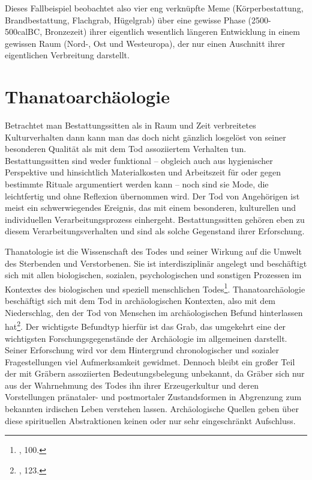 \documentclass[openany,twoside,twocolumn]{book}
\let\rmarkdownfootnote\footnote%
\def\footnote{\protect\rmarkdownfootnote}
\begin{document}
Dieses Fallbeispiel beobachtet also vier eng verknüpfte Meme
(Körperbestattung, Brandbestattung, Flachgrab, Hügelgrab) über eine
gewisse Phase (2500-500calBC, Bronzezeit) ihrer eigentlich wesentlich
längeren Entwicklung in einem gewissen Raum (Nord-, Ost und Westeuropa),
der nur einen Auschnitt ihrer eigentlichen Verbreitung darstellt.

\hypertarget{thanatoarchaologie}{%
\section{Thanatoarchäologie}\label{thanatoarchaologie}}

Betrachtet man Bestattungssitten als in Raum und Zeit verbreitetes
Kulturverhalten dann kann man das doch nicht gänzlich losgelöst von
seiner besonderen Qualität als mit dem Tod assoziiertem Verhalten tun.
Bestattungssitten sind weder funktional -- obgleich auch aus
hygienischer Perspektive und hinsichtlich Materialkosten und Arbeitszeit
für oder gegen bestimmte Rituale argumentiert werden kann -- noch sind
sie Mode, die leichtfertig und ohne Reflexion übernommen wird. Der Tod
von Angehörigen ist meist ein schwerwiegendes Ereignis, das mit einem
besonderen, kulturellen und individuellen Verarbeitungsprozess
einhergeht. Bestattungssitten gehören eben zu diesem
Verarbeitungsverhalten und sind als solche Gegenstand ihrer Erforschung.

Thanatologie ist die Wissenschaft des Todes und seiner Wirkung auf die
Umwelt des Sterbenden und Verstorbenen. Sie ist interdisziplinär
angelegt und beschäftigt sich mit allen biologischen, sozialen,
psychologischen und sonstigen Prozessen im Kontextes des biologischen
und speziell menschlichen Todes\footnote{\textcite{hofmann_rituelle_2008},
  100.}. Thanatoarchäologie beschäftigt sich mit dem Tod in
archäologischen Kontexten, also mit dem Niederschlag, den der Tod von
Menschen im archäologischen Befund hinterlassen hat\footnote{\textcite{hofmann_rituelle_2008},
  123.}. Der wichtigste Befundtyp hierfür ist das Grab, das umgekehrt
eine der wichtigsten Forschungsgegenstände der Archäologie im
allgemeinen darstellt. Seiner Erforschung wird vor dem Hintergrund
chronologischer und sozialer Fragestellungen viel Aufmerksamkeit
gewidmet. Dennoch bleibt ein großer Teil der mit Gräbern assoziierten
Bedeutungsbelegung unbekannt, da Gräber sich nur aus der Wahrnehmung des
Todes ihn ihrer Erzeugerkultur und deren Vorstellungen pränataler- und
postmortaler Zustandsformen in Abgrenzung zum bekannten irdischen Leben
verstehen lassen. Archäologische Quellen geben über diese spirituellen
Abstraktionen keinen oder nur sehr eingeschränkt Aufschluss.
\end{document}
